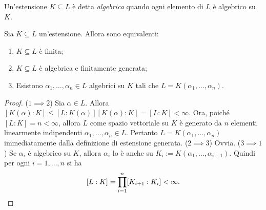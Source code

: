 \begin{defi}
Un'estensione \(K \subseteq L\) è detta {\em algebrica} quando ogni elemento di \(L\) è algebrico su \(K\).
\end{defi}

\begin{prop}\label{prop:EstensioneFinitaEquivalenti}
Sia \(K \subseteq L\) un'estensione. Allora sono equivalenti:
\begin{enumerate}
\item \(K \subseteq L\) è finita;
\item \(K \subseteq L\) è algebrica e finitamente generata;
\item Esistono \(\alpha_1, \dots{}, \alpha_n \in L\) algebrici su \(K\) tali che \(L = K(\alpha_1,\dots,\alpha_n)\).
\end{enumerate}
\end{prop}

\begin{proof}
(\(1 \implies 2\)) Sia \(\alpha \in L\). Allora \([K(\alpha):K] \le [L:K(\alpha)] [K(\alpha):K] = [L:K] < \infty\). Ora, poiché \([L:K] = n < \infty\), allora \(L\) come spazio vettoriale su \(K\) è generato da \(n\) elementi linearmente indipendenti \(\alpha_1, \dots{}, \alpha_n \in L\). Pertanto \(L=K(\alpha_1,\dots,\alpha_n)\) immediatamente dalla definizione di estensione generata.\newline
(\(2 \implies 3\)) Ovvia.\newline
(\(3\implies1\)) Se \(\alpha_i\) è algebrico su \(K\), allora \(\alpha_i\) lo è anche su \(K_i:=K(\alpha_1,\dots,\alpha_{i-1})\). Quindi per ogni \(i=1,\dots,n\) si ha
\[[L:K]=\prod_{i=1}^n[K_{i+1}:K_i]<\infty .\qedhere\]
\end{proof}


